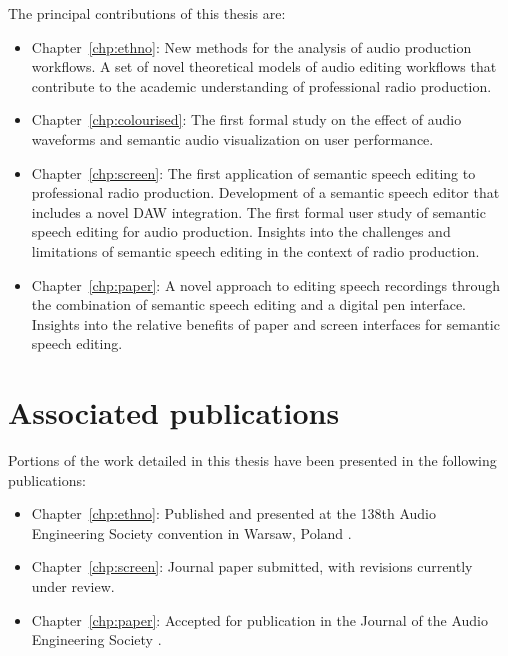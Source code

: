 The principal contributions of this thesis are:
\begin{itemize}
  \item Chapter~\ref{chp:ethno}: 
    New methods for the analysis of audio production workflows. A set of novel theoretical models of audio editing
    workflows that contribute to the academic understanding of professional radio production.
  \item Chapter~\ref{chp:colourised}: 
    The first formal study on the effect of audio waveforms and semantic audio visualization on user performance.
  \item Chapter~\ref{chp:screen}: 
    The first application of semantic speech editing to professional radio production. Development of a semantic speech
    editor that includes a novel DAW integration. The first formal user study of semantic speech editing for audio
    production. Insights into the challenges and limitations of semantic speech editing in the context of radio
    production. 
  \item Chapter~\ref{chp:paper}:
    A novel approach to editing speech recordings through the combination of semantic speech editing and a digital pen
    interface. Insights into the relative benefits of paper and screen interfaces for semantic speech editing.
\end{itemize}

\section{Associated publications}\label{sec:intro-publications}

Portions of the work detailed in this thesis have been presented in the following publications:


\begin{itemize}
  \item Chapter~\ref{chp:ethno}: Published and presented at the 138th Audio Engineering Society convention in Warsaw,
    Poland \citep{Baume2015}.
  \item Chapter~\ref{chp:screen}: Journal paper submitted, with revisions currently under review.
  \item Chapter~\ref{chp:paper}: Accepted for publication in the Journal of the Audio Engineering Society
    \citep{Baume2018}.
\end{itemize}

